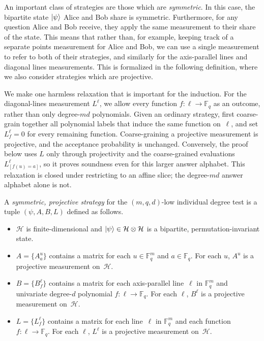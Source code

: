 \documentclass[11pt]{article}
\theoremstyle{definition}
\newcommand{\F}{\mathbb F}
\newcommand{\ot}{\otimes}
\newcommand{\calH}{\mathcal{H}}
\begin{document}
An important class of strategies are those which are \emph{symmetric}.
In this case, the bipartite state $\ket{\psi}$ Alice and Bob share is symmetric.
Furthermore, for any question Alice and Bob receive, they apply the same measurement to their share of the state.
This means that rather than, for example, keeping track of a separate points measurement for Alice and Bob,
we can use a single measurement to refer to both of their strategies,
and similarly for the axis-parallel lines and diagonal lines measurements.
This is formalized in the following definition, where we also consider strategies which are projective.

We make one harmless relaxation that is important for the induction.
For the diagonal-lines measurement $L^\ell$, we allow every function
$f:\ell\to\F_q$ as an outcome, rather than only degree-$md$
polynomials.  Given an ordinary strategy, first coarse-grain together
all polynomial labels that induce the same function on~$\ell$, and set
$L^\ell_f=0$ for every remaining function.  Coarse-graining a
projective measurement is projective, and the acceptance probability
is unchanged.  Conversely, the proof below uses $L$ only through
projectivity and the coarse-grained evaluations
$L^\ell_{[f(u)=a]}$, so it proves soundness even for this larger answer
alphabet.  This relaxation is closed under restricting to an affine
slice; the degree-$md$ answer alphabet alone is not.

\begin{definition}
A \emph{symmetric, projective strategy} for the $(m,q, d)$-low individual degree test
is a tuple $(\psi, A, B, L)$ defined as follows.
\begin{itemize}
\item[$\circ$] $\calH$ is finite-dimensional and
$\ket{\psi} \in \calH \ot \calH$ is a bipartite, permutation-invariant state.
\item[$\circ$] $A = \{A^u_a\}$ contains a matrix for each $u \in \F_q^m$ and $a \in \F_q$.
			For each $u$, $A^u$ is a projective measurement on~$\calH$.
\item[$\circ$] $B = \{B^{\ell}_f\}$ contains a matrix for each axis-parallel line~$\ell$ in $\F_q^m$
			and univariate degree-$d$ polynomial $f:\ell\rightarrow \F_q$.
			For each $\ell$, $B^{\ell}$ is a projective measurement on~$\calH$.
\item[$\circ$] $L = \{L^{\ell}_f\}$ contains a matrix for each line~$\ell$ in $\F_q^m$
			and each function $f:\ell\rightarrow \F_q$.
			For each $\ell$, $L^{\ell}$ is a projective measurement on~$\calH$.
\end{itemize}
\end{definition}
\end{document}
